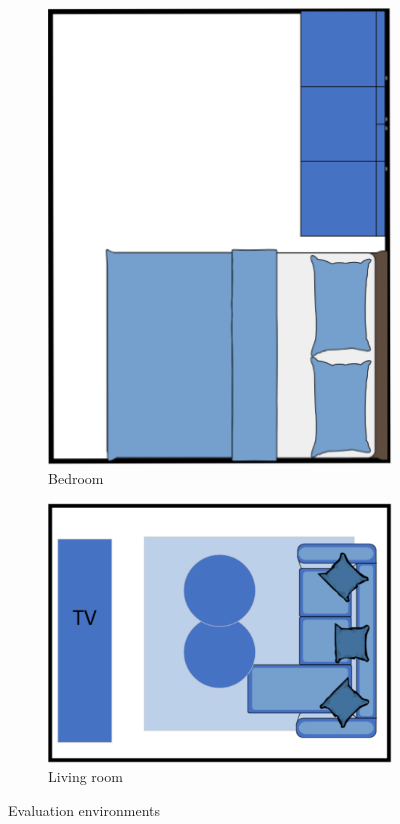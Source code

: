 \begin{figure}[H]
\begin{subfigure}{0.35\textwidth}
        \includegraphics[width=\linewidth]{figures/Liveroom2.png}
        \caption{Bedroom}
        \label{fig:Liveroom2}
    \end{subfigure}
    \hfill
    \begin{subfigure}{0.45\textwidth}
        \centering
        \includegraphics[width=\linewidth]{figures/Liveroom3.png}
        \caption{Living room}
        \label{fig:Liveroom3}
    \end{subfigure}
    
    \caption{Evaluation environments}
    \label{fig:Liveroom}
\end{figure}

